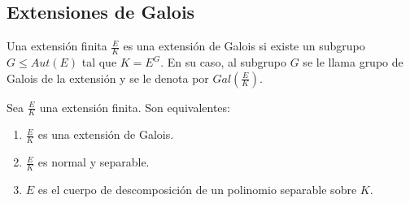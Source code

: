 \subsection{Extensiones de Galois}

\begin{definition}
Una extensión finita $\frac{E}{K}$ es una extensión de Galois si existe un subgrupo $G \le Aut(E)$ tal que $K = E^G$. En su caso, al subgrupo $G$ se le llama grupo de Galois de la extensión y se le denota por $Gal(\frac{E}{K})$. 
\end{definition}

\begin{proposition}
Sea $\frac{E}{K}$ una extensión finita. Son equivalentes:

\begin{enumerate}
\item $\frac{E}{K}$ es una extensión de Galois.
\item $\frac{E}{K}$ es normal y separable.
\item $E$ es el cuerpo de descomposición de un polinomio separable sobre $K$. 
\end{enumerate}
\end{proposition}
